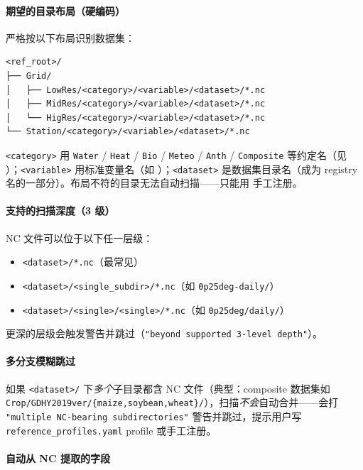 \paragraph{期望的目录布局（硬编码）}

\openbench{} 严格按以下布局识别数据集：

\begin{verbatim}
<ref_root>/
├── Grid/
│   ├── LowRes/<category>/<variable>/<dataset>/*.nc
│   ├── MidRes/<category>/<variable>/<dataset>/*.nc
│   └── HigRes/<category>/<variable>/<dataset>/*.nc
└── Station/<category>/<variable>/<dataset>/*.nc
\end{verbatim}

\texttt{<category>} 用 \texttt{Water} / \texttt{Heat} / \texttt{Bio} / \texttt{Meteo} / \texttt{Anth} / \texttt{Composite} 等约定名（见 ）；\texttt{<variable>} 用标准变量名（如 ）；\texttt{<dataset>} 是数据集目录名（成为 registry 名的一部分）。布局不符的目录无法自动扫描——只能用  手工注册。

\paragraph{支持的扫描深度（3 级）}

NC 文件可以位于以下任一层级：

\begin{itemize}
  \item \texttt{<dataset>/*.nc}（最常见）
  \item \texttt{<dataset>/<single\_subdir>/*.nc}（如 \texttt{0p25deg-daily/}）
  \item \texttt{<dataset>/<single>/<single>/*.nc}（如 \texttt{0p25deg/daily/}）
\end{itemize}

更深的层级会触发警告并跳过（\texttt{"beyond supported 3-level depth"}）。

\paragraph{多分支模糊跳过}

如果 \texttt{<dataset>/} 下\emph{多个}子目录都含 NC 文件（典型：composite 数据集如 \texttt{Crop/GDHY2019ver/\{maize,soybean,wheat\}/}），扫描\emph{不会}自动合并——会打 \texttt{"multiple NC-bearing subdirectories"} 警告并跳过，提示用户写 \texttt{reference\_profiles.yaml} profile 或手工注册。

\paragraph{自动从 NC 提取的字段}

